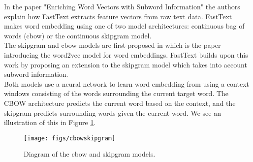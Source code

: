 In the paper "Enriching Word Vectors with Subword Information" \cite{EnrichingWordVectors} the authors explain how FastText extracts feature vectors from raw text data. FastText makes word embedding using one of two model architectures: continuous bag of words (cbow) or the continuous skipgram model.\\

The skipgram and cbow models are first proposed in \cite{EfficientWordRepresentations} which is the paper introducing the word2vec model for word embeddings. FastText builds upon this work by proposing an extension to the skipgram model which takes into account subword information.\\

Both models use a neural network to learn word embedding from using a context windows consisting of the words surrounding the current target word. The CBOW architecture predicts the current word based on the context, and the skipgram predicts surrounding words given the current word.\cite{EfficientWordRepresentations} We see an illustration of this in Figure \ref{cbowskipgram}.

\begin{figure}[h!]
  \centering
  \texttt{[image: figs/cbowskipgram]}
  \caption{Diagram of the cbow and skipgram models.}
  \label{cbowskipgram}
\end{figure}



%



